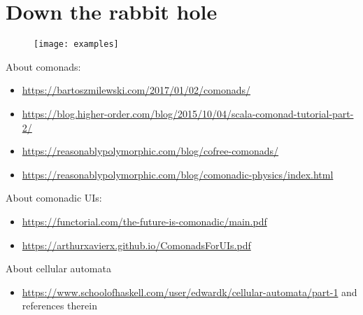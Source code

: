 \documentclass[10pt]{beamer}
\begin{document}
\begin{frame}[fragile]
  \begin{lstlisting}[language=haskell, basicstyle=\ttfamily]
  \end{lstlisting}
\end{frame}

\begin{frame}[fragile]
  \begin{lstlisting}[language=haskell, basicstyle=\ttfamily]
  \end{lstlisting}
\end{frame}


\section{Down the rabbit hole}

\begin{frame}[fragile]
\begin{figure}
    \centering
    \texttt{[image: examples]}
  \end{figure}
\end{frame}


\begin{frame}[fragile]
  About comonads:
  \begin{itemize}
    \item \url{https://bartoszmilewski.com/2017/01/02/comonads/}
    \item \url{https://blog.higher-order.com/blog/2015/10/04/scala-comonad-tutorial-part-2/}
    \item \url{https://reasonablypolymorphic.com/blog/cofree-comonads/}
    \item \url{https://reasonablypolymorphic.com/blog/comonadic-physics/index.html}
  \end{itemize}
\end{frame}
\begin{frame}[fragile]
  About comonadic UIs:
  \begin{itemize}
    \item \url{https://functorial.com/the-future-is-comonadic/main.pdf}
    \item \url{https://arthurxavierx.github.io/ComonadsForUIs.pdf}
  \end{itemize}
  About cellular automata
  \begin{itemize}
    \item \url{https://www.schoolofhaskell.com/user/edwardk/cellular-automata/part-1} and references therein
  \end{itemize}
\end{frame}
\end{document}
